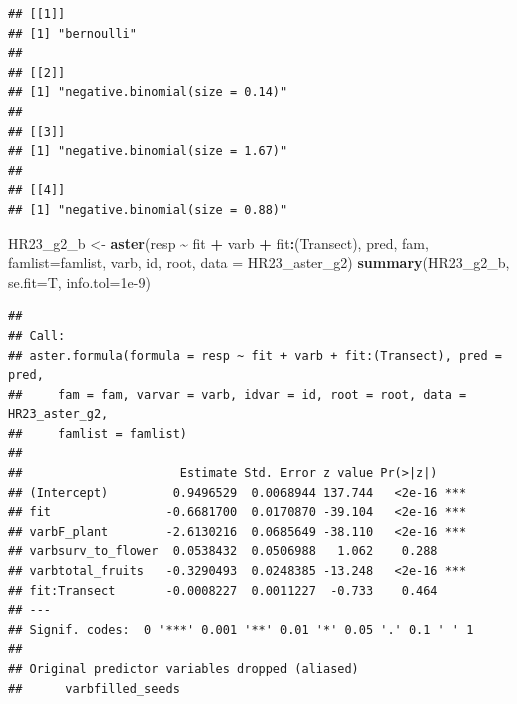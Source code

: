 \documentclass[
]{article}
\newenvironment{Shaded}{\begin{snugshade}}{\end{snugshade}}
\newcommand{\AttributeTok}[1]{\textcolor[rgb]{0.13,0.29,0.53}{#1}}
\newcommand{\FloatTok}[1]{\textcolor[rgb]{0.00,0.00,0.81}{#1}}
\newcommand{\FunctionTok}[1]{\textcolor[rgb]{0.13,0.29,0.53}{\textbf{#1}}}
\newcommand{\NormalTok}[1]{#1}
\newcommand{\OtherTok}[1]{\textcolor[rgb]{0.56,0.35,0.01}{#1}}
\newcommand{\SpecialCharTok}[1]{\textcolor[rgb]{0.81,0.36,0.00}{\textbf{#1}}}
\begin{document}
\begin{verbatim}
## [[1]]
## [1] "bernoulli"
## 
## [[2]]
## [1] "negative.binomial(size = 0.14)"
## 
## [[3]]
## [1] "negative.binomial(size = 1.67)"
## 
## [[4]]
## [1] "negative.binomial(size = 0.88)"
\end{verbatim}

\begin{Shaded}
\begin{Highlighting}[]
\NormalTok{HR23\_g2\_b }\OtherTok{\textless{}{-}} \FunctionTok{aster}\NormalTok{(resp }\SpecialCharTok{\textasciitilde{}}\NormalTok{ fit }\SpecialCharTok{+}\NormalTok{ varb }\SpecialCharTok{+}\NormalTok{ fit}\SpecialCharTok{:}\NormalTok{(Transect), pred, fam, }\AttributeTok{famlist=}\NormalTok{famlist, varb, id, root, }\AttributeTok{data =}\NormalTok{ HR23\_aster\_g2) }
\FunctionTok{summary}\NormalTok{(HR23\_g2\_b, }\AttributeTok{se.fit=}\NormalTok{T, }\AttributeTok{info.tol=}\FloatTok{1e{-}9}\NormalTok{)}
\end{Highlighting}
\end{Shaded}

\begin{verbatim}
## 
## Call:
## aster.formula(formula = resp ~ fit + varb + fit:(Transect), pred = pred, 
##     fam = fam, varvar = varb, idvar = id, root = root, data = HR23_aster_g2, 
##     famlist = famlist)
## 
##                      Estimate Std. Error z value Pr(>|z|)    
## (Intercept)         0.9496529  0.0068944 137.744   <2e-16 ***
## fit                -0.6681700  0.0170870 -39.104   <2e-16 ***
## varbF_plant        -2.6130216  0.0685649 -38.110   <2e-16 ***
## varbsurv_to_flower  0.0538432  0.0506988   1.062    0.288    
## varbtotal_fruits   -0.3290493  0.0248385 -13.248   <2e-16 ***
## fit:Transect       -0.0008227  0.0011227  -0.733    0.464    
## ---
## Signif. codes:  0 '***' 0.001 '**' 0.01 '*' 0.05 '.' 0.1 ' ' 1
## 
## Original predictor variables dropped (aliased)
##      varbfilled_seeds
\end{verbatim}
\end{document}
